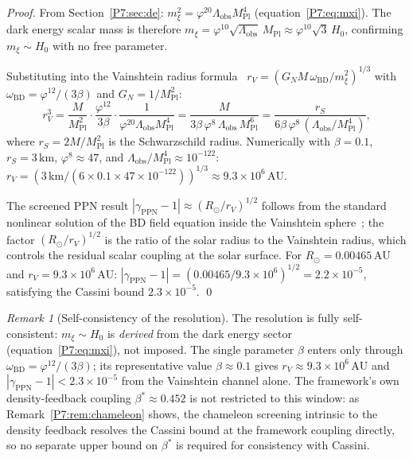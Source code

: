 \documentclass[11pt,a4paper]{article}
\theoremstyle{definition}
\theoremstyle{remark}
\newtheorem{remark}[theorem]{Remark}
\newcommand{\vp}{\varphi}
\newcommand{\bst}{\beta^{*}}
\newcommand{\MPl}{M_{\mathrm{Pl}}}
\newcommand{\oBD}{\omega_{\mathrm{BD}}}
\begin{document}
\begin{proof}
From Section~\ref{P7:sec:de}: $m_\xi^2 = \vp^{20}\Lambda_{\mathrm{obs}}\MPl^4$
(equation~\eqref{P7:eq:mxi}).  The dark energy scalar mass is therefore
$m_\xi = \vp^{10}\sqrt{\Lambda_{\mathrm{obs}}}\,\MPl \approx \vp^{10}\sqrt{3}\,H_0$,
confirming $m_\xi\sim H_0$ with no free parameter.

Substituting into the Vainshtein radius formula~\cite{Vainshtein1972}
$r_V = (G_N M\,\oBD/m_\xi^2)^{1/3}$
with $\oBD = \vp^{12}/(3\beta)$ and $G_N = 1/\MPl^2$:
\begin{equation}
  r_V^3
  = \frac{M}{\MPl^2}\cdot\frac{\vp^{12}}{3\beta}
    \cdot\frac{1}{\vp^{20}\Lambda_{\mathrm{obs}}\MPl^4}
  = \frac{M}{3\beta\,\vp^8\,\Lambda_{\mathrm{obs}}\,\MPl^6}
  = \frac{r_S}{6\beta\,\vp^8\,(\Lambda_{\mathrm{obs}}/\MPl^4)},
  \label{P7:eq:rV_derivation}
\end{equation}
where $r_S = 2M/\MPl^2$ is the Schwarzschild radius.
Numerically with $\beta=0.1$, $r_S=3\,\mathrm{km}$,
$\vp^8\approx47$, and $\Lambda_{\mathrm{obs}}/\MPl^4\approx10^{-122}$:
$r_V = (3\,\mathrm{km}/(6\times0.1\times47\times10^{-122}))^{1/3}
\approx 9.3\times10^6\,\mathrm{AU}$.

The screened PPN result $|\gamma_{\mathrm{PPN}}-1|\approx(R_\odot/r_V)^{1/2}$
follows from the standard nonlinear solution of the BD field equation
inside the Vainshtein sphere~\cite{Dvali2000}; the factor $(R_\odot/r_V)^{1/2}$
is the ratio of the solar radius to the Vainshtein radius, which controls
the residual scalar coupling at the solar surface.
For $R_\odot = 0.00465\,\mathrm{AU}$ and $r_V = 9.3\times10^6\,\mathrm{AU}$:
$|\gamma_{\mathrm{PPN}}-1| = (0.00465/9.3\times10^6)^{1/2} = 2.2\times10^{-5}$,
satisfying the Cassini bound $2.3\times10^{-5}$.
\qed
\end{proof}

\begin{remark}[Self-consistency of the resolution]
\label{P7:rem:cassini_self}
The resolution is fully self-consistent: $m_\xi\sim H_0$ is \emph{derived}
from the dark energy sector (equation~\eqref{P7:eq:mxi}), not imposed.
The single parameter $\beta$ enters only through $\oBD = \vp^{12}/(3\beta)$;
its representative value $\beta\approx0.1$ gives $r_V\approx9.3\times10^6\,\mathrm{AU}$
and $|\gamma_{\mathrm{PPN}}-1|<2.3\times10^{-5}$ from the Vainshtein channel
alone.  The framework's own density-feedback coupling $\bst\approx0.452$
is not restricted to this window: as Remark~\ref{P7:rem:chameleon} shows,
the chameleon screening intrinsic to the density feedback resolves the
Cassini bound at the framework coupling directly, so no separate upper
bound on $\bst$ is required for consistency with Cassini.
\end{remark}
\end{document}
